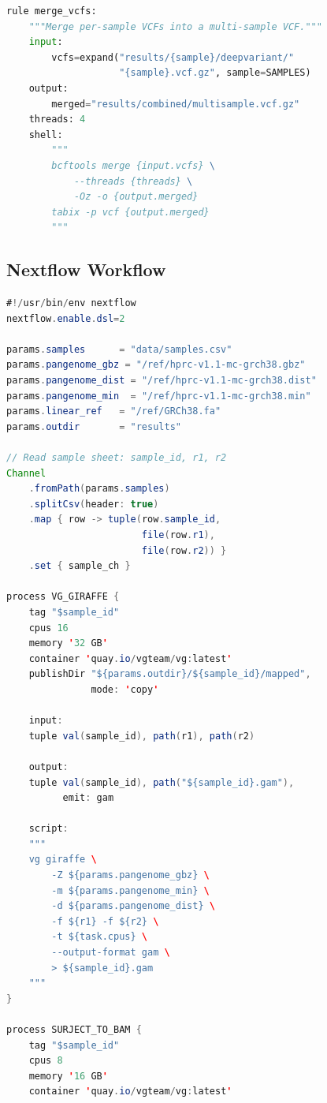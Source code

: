 \begin{lstlisting}[language=Python, caption={Snakemake workflow for pangenome-based variant calling using vg giraffe.}, label={lst:emerging:snakemake}]
rule merge_vcfs:
    """Merge per-sample VCFs into a multi-sample VCF."""
    input:
        vcfs=expand("results/{sample}/deepvariant/"
                    "{sample}.vcf.gz", sample=SAMPLES)
    output:
        merged="results/combined/multisample.vcf.gz"
    threads: 4
    shell:
        """
        bcftools merge {input.vcfs} \
            --threads {threads} \
            -Oz -o {output.merged}
        tabix -p vcf {output.merged}
        """
\end{lstlisting}

\subsection{Nextflow Workflow}
\label{subsec:emerging:pangenome-nextflow}

\begin{lstlisting}[language=Java, caption={Nextflow workflow for pangenome-based variant calling.}, label={lst:emerging:nextflow}]
#!/usr/bin/env nextflow
nextflow.enable.dsl=2

params.samples      = "data/samples.csv"
params.pangenome_gbz = "/ref/hprc-v1.1-mc-grch38.gbz"
params.pangenome_dist = "/ref/hprc-v1.1-mc-grch38.dist"
params.pangenome_min  = "/ref/hprc-v1.1-mc-grch38.min"
params.linear_ref   = "/ref/GRCh38.fa"
params.outdir       = "results"

// Read sample sheet: sample_id, r1, r2
Channel
    .fromPath(params.samples)
    .splitCsv(header: true)
    .map { row -> tuple(row.sample_id,
                        file(row.r1),
                        file(row.r2)) }
    .set { sample_ch }

process VG_GIRAFFE {
    tag "$sample_id"
    cpus 16
    memory '32 GB'
    container 'quay.io/vgteam/vg:latest'
    publishDir "${params.outdir}/${sample_id}/mapped",
               mode: 'copy'

    input:
    tuple val(sample_id), path(r1), path(r2)

    output:
    tuple val(sample_id), path("${sample_id}.gam"),
          emit: gam

    script:
    """
    vg giraffe \
        -Z ${params.pangenome_gbz} \
        -m ${params.pangenome_min} \
        -d ${params.pangenome_dist} \
        -f ${r1} -f ${r2} \
        -t ${task.cpus} \
        --output-format gam \
        > ${sample_id}.gam
    """
}

process SURJECT_TO_BAM {
    tag "$sample_id"
    cpus 8
    memory '16 GB'
    container 'quay.io/vgteam/vg:latest'


\end{lstlisting}
